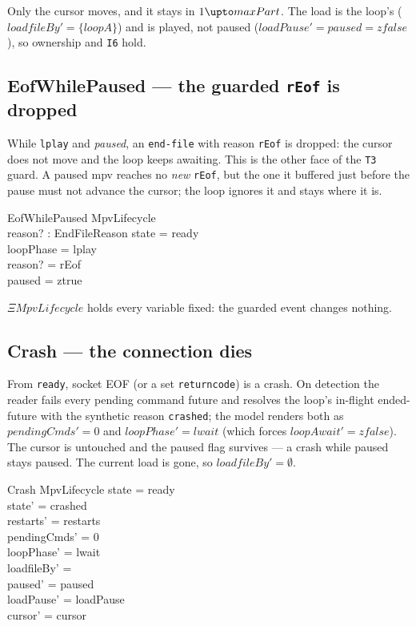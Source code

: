 \documentclass[a4paper,10pt,fleqn]{article}
\begin{document}
Only the cursor moves, and it stays in $1 \upto maxPart$. The load is the
loop's ($loadfileBy' = \{ loopA \}$) and is played, not paused ($loadPause' =
paused = zfalse$), so ownership and \texttt{I6} hold.

\subsection{EofWhilePaused --- the guarded \texttt{rEof} is dropped}
\label{sec:eofpaused}

While \texttt{lplay} and \emph{paused}, an \texttt{end-file} with reason
\texttt{rEof} is dropped: the cursor does not move and the loop keeps awaiting.
This is the other face of the \texttt{T3} guard. A paused mpv reaches no
\emph{new} \texttt{rEof}, but the one it buffered just before the pause must not
advance the cursor; the loop ignores it and stays where it is.

\begin{schema}{EofWhilePaused}
  \Xi MpvLifecycle \\
  reason? : EndFileReason
  \where
  state = ready \\
  loopPhase = lplay \\
  reason? = rEof \\
  paused = ztrue
\end{schema}

$\Xi MpvLifecycle$ holds every variable fixed: the guarded event changes
nothing.

\subsection{Crash --- the connection dies}
\label{sec:crash}

From \texttt{ready}, socket EOF (or a set \texttt{returncode}) is a crash. On
detection the reader fails every pending command future and resolves the loop's
in-flight ended-future with the synthetic reason \texttt{crashed}; the model
renders both as $pendingCmds' = 0$ and $loopPhase' = lwait$ (which forces
$loopAwait' = zfalse$). The cursor is untouched and the paused flag survives ---
a crash while paused stays paused. The current load is gone, so $loadfileBy' =
\emptyset$.

\begin{schema}{Crash}
  \Delta MpvLifecycle
  \where
  state = ready \\
  state' = crashed \\
  restarts' = restarts \\
  pendingCmds' = 0 \\
  loopPhase' = lwait \\
  loadfileBy' = \emptyset \\
  paused' = paused \\
  loadPause' = loadPause \\
  cursor' = cursor
\end{schema}
\end{document}
